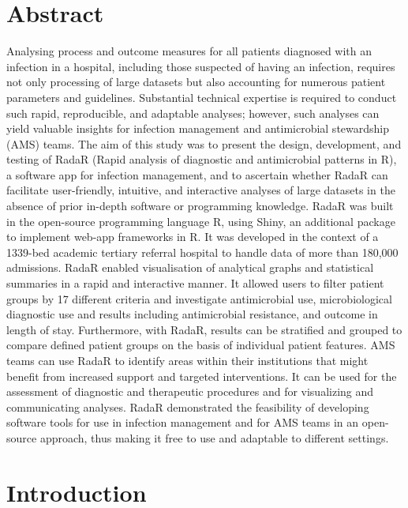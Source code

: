 \documentclass[
]{book}
\begin{document}
\hypertarget{abstract-3}{%
\section*{Abstract}\label{abstract-3}}

Analysing process and outcome measures for all patients diagnosed with an infection in a hospital, including those suspected of having an infection, requires not only processing of large datasets but also accounting for numerous patient parameters and guidelines. Substantial technical expertise is required to conduct such rapid, reproducible, and adaptable analyses; however, such analyses can yield valuable insights for infection management and antimicrobial stewardship (AMS) teams. The aim of this study was to present the design, development, and testing of RadaR (Rapid analysis of diagnostic and antimicrobial patterns in R), a software app for infection management, and to ascertain whether RadaR can facilitate user-friendly, intuitive, and interactive analyses of large datasets in the absence of prior in-depth software or programming knowledge. RadaR was built in the open-source programming language R, using Shiny, an additional package to implement web-app frameworks in R. It was developed in the context of a 1339-bed academic tertiary referral hospital to handle data of more than 180,000 admissions. RadaR enabled visualisation of analytical graphs and statistical summaries in a rapid and interactive manner. It allowed users to filter patient groups by 17 different criteria and investigate antimicrobial use, microbiological diagnostic use and results including antimicrobial resistance, and outcome in length of stay. Furthermore, with RadaR, results can be stratified and grouped to compare defined patient groups on the basis of individual patient features. AMS teams can use RadaR to identify areas within their institutions that might benefit from increased support and targeted interventions. It can be used for the assessment of diagnostic and therapeutic procedures and for visualizing and communicating analyses. RadaR demonstrated the feasibility of developing software tools for use in infection management and for AMS teams in an open-source approach, thus making it free to use and adaptable to different settings.

\hypertarget{introduction-2}{%
\section{Introduction}\label{introduction-2}}
\end{document}
